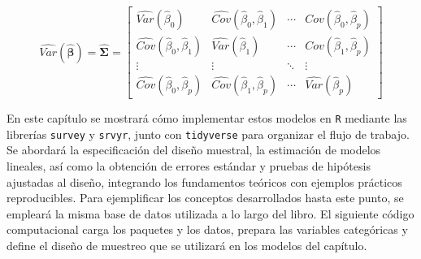 \documentclass[
  spanish,
  11pt,
  letterpaper,
  oneside,
  open=any]{scrbook}
\begin{document}
\[
\widehat{Var}(\hat{\boldsymbol{\beta}}) = \hat{\boldsymbol\Sigma} =
\begin{bmatrix}
\widehat{Var}(\hat{\beta}_{0}) & \widehat{Cov}(\hat{\beta}_{0},\hat{\beta}_{1}) & \cdots & \widehat{Cov}(\hat{\beta}_{0},\hat{\beta}_{p}) \\
\widehat{Cov}(\hat{\beta}_{0},\hat{\beta}_{1}) & \widehat{Var}(\hat{\beta}_{1}) & \cdots & \widehat{Cov}(\hat{\beta}_{1},\hat{\beta}_{p}) \\
\vdots & \vdots & \ddots & \vdots \\
\widehat{Cov}(\hat{\beta}_{0},\hat{\beta}_{p}) & \widehat{Cov}(\hat{\beta}_{1},\hat{\beta}_{p}) & \cdots & \widehat{Var}(\hat{\beta}_{p})
\end{bmatrix}
\]

En este capítulo se mostrará cómo implementar estos modelos en
\texttt{R} mediante las librerías \texttt{survey} y \texttt{srvyr},
junto con \texttt{tidyverse} para organizar el flujo de trabajo. Se
abordará la especificación del diseño muestral, la estimación de modelos
lineales, así como la obtención de errores estándar y pruebas de
hipótesis ajustadas al diseño, integrando los fundamentos teóricos con
ejemplos prácticos reproducibles. Para ejemplificar los conceptos
desarrollados hasta este punto, se empleará la misma base de datos
utilizada a lo largo del libro. El siguiente código computacional carga
los paquetes y los datos, prepara las variables categóricas y define el
diseño de muestreo que se utilizará en los modelos del capítulo.
\end{document}
